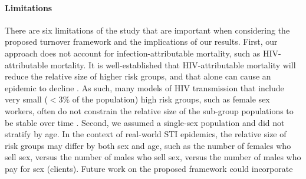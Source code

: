 \paragraph{Limitations}
There are six limitations of the study that are important when considering
the proposed turnover framework and the implications of our results.
First, our approach does not account for
infection-attributable mortality, such as HIV-attributable mortality.
It is well-established that HIV-attributable mortality will reduce the 
relative size of higher risk groups,
and that alone can cause an epidemic to decline \citep{Boily1997}.
As such, many models of HIV transmission
that include very small ($<3\%$ of the population)
high risk groups, such as female sex workers,
often do not constrain the relative size
of the sub-group populations to be stable over time
\citep{Pickles2013}.
Second, we assumed a single-sex population and did not stratify by age.
In the context of real-world STI epidemics,
the relative size of risk groups may differ
by both sex and age,
such as the number of females who sell sex,
versus the number of males who sell sex,
versus the number of males who pay for sex (clients).
Future work on the proposed framework could incorporate
